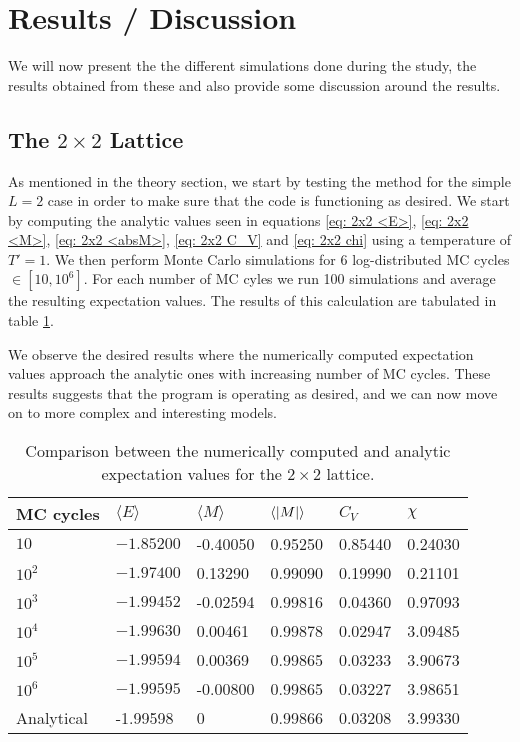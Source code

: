 \documentclass[a4paper, 10pt, reqno]{amsart}
\begin{document}
\section{Results / Discussion}

We will now present the the different simulations done during the study, the results obtained from these and also provide some discussion around the results.

\subsection{The $2 \times 2$ Lattice} As mentioned in the theory section, we  start by testing the method for the simple $L = 2$ case in order to make sure that the code is functioning as desired. We start by computing the analytic values seen in equations \eqref{eq: 2x2 <E>}, \eqref{eq: 2x2 <M>}, \eqref{eq: 2x2 <absM>}, \eqref{eq: 2x2 C_V} and \eqref{eq: 2x2 chi} using a temperature of $T' = 1$. We then perform Monte Carlo simulations for 6 log-distributed MC cycles $\in [10,10^6]$. For each number of MC cyles we run 100 simulations and average the resulting expectation values. The results of this calculation are tabulated in table \ref{table: 2x2}. 

We observe the desired results where the numerically computed expectation values approach the analytic ones with increasing number of MC cycles. These results suggests that the program is operating as desired, and we can now move on to more complex and interesting models.

\begin{table}[]
\begin{tabular}{llllll}
\hline
MC cycles & $\langle E \rangle$ & $\langle M \rangle$ & $\langle \abs{M}\rangle$ & $C_V$ & $\chi$ \\ \hline
$10$ & $-1.85200$ &-0.40050  & 0.95250 & 0.85440 & 0.24030 \\
$10^2$ & $-1.97400$ & 0.13290 & 0.99090 &0.19990 & 0.21101 \\
$10^3$ & $-1.99452$ & -0.02594 & 0.99816 & 0.04360 & 0.97093 \\
$10^4$ & $-1.99630$ & 0.00461 & 0.99878 & 0.02947 & 3.09485 \\
$10^5$ & $-1.99594$ &0.00369&  0.99865 &0.03233 & 3.90673 \\
$10^6$ & $-1.99595$ & -0.00800 & 0.99865 & 0.03227 & 3.98651 \\ \hline
Analytical & -1.99598 & 0 & 0.99866 & 0.03208 &3.99330\\ \hline
\end{tabular}
\caption{Comparison between the numerically computed and analytic expectation values for the $2 \times 2$ lattice.}
\label{table: 2x2}
\end{table}
\end{document}

